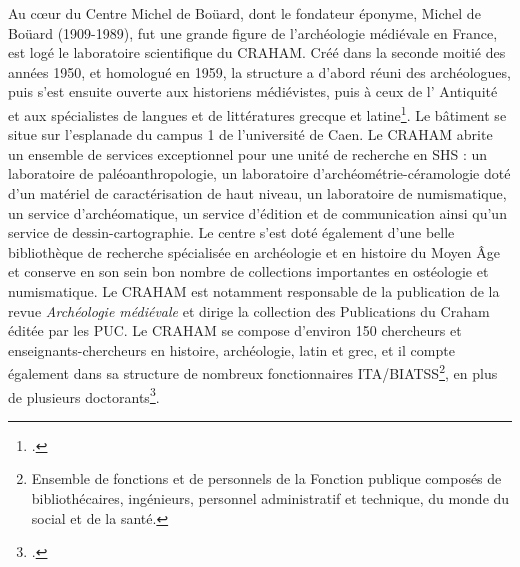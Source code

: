 \documentclass[a4paper,12pt,twoside]{book}
\begin{document}
    Au c\oe{}ur du Centre Michel de Boüard, dont le fondateur éponyme, Michel de Boüard (1909-1989), fut une grande figure de l'archéologie médiévale en France, est logé le laboratoire scientifique du CRAHAM. Créé dans la seconde moitié des années 1950, et homologué en 1959, la structure a d'abord réuni des archéologues, puis s'est ensuite ouverte aux historiens médiévistes, puis à ceux de l' Antiquité et aux spécialistes de langues et de littératures grecque et latine\footcite{craham}. Le bâtiment se situe sur l'esplanade du campus 1 de l'université de Caen. Le \acrshort{CRAHAM} abrite un ensemble de services exceptionnel pour une unité de recherche en \acrshort{SHS} : un laboratoire de paléoanthropologie, un laboratoire d'archéométrie-céramologie doté d'un matériel de caractérisation de haut niveau, un laboratoire de numismatique, un service d'archéomatique, un service d'édition et de communication ainsi qu'un service de dessin-cartographie. Le centre s'est doté également d'une belle bibliothèque de recherche spécialisée en archéologie et en histoire du Moyen Âge et conserve en son sein bon nombre de collections importantes en ostéologie et numismatique. Le \acrshort{CRAHAM} est notamment responsable de la publication de la revue \textit{Archéologie médiévale} et dirige la collection des \og Publications du Craham\fg{} éditée par les \acrlong{PUC}. Le \acrshort{CRAHAM} se compose d'environ 150 chercheurs et enseignants-chercheurs en histoire, archéologie, latin et grec, et il compte également dans sa structure de nombreux fonctionnaires ITA/BIATSS\footnote{Ensemble de fonctions et de personnels de la Fonction publique composés de bibliothécaires, ingénieurs, personnel administratif et technique, du monde du social et de la santé.}, en plus de plusieurs doctorants\footcite{craham}.
\end{document}
